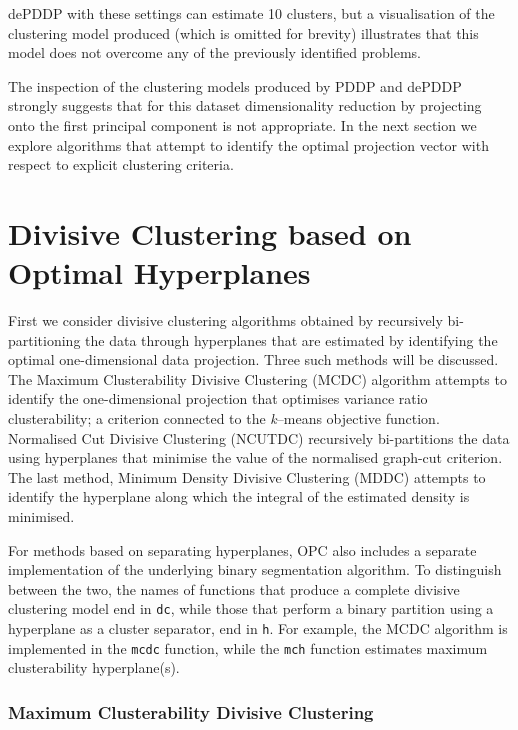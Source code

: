 \documentclass{book}
\begin{document}
\noindent
%
dePDDP with these settings can estimate
10 clusters, but a visualisation of the clustering model produced (which is
omitted for brevity) illustrates that this model does not overcome any of
the previously identified problems.


The inspection of the clustering models produced by PDDP and dePDDP strongly
suggests that for this dataset dimensionality reduction by projecting onto the
first principal component is not appropriate.
%
In the next section we explore algorithms that attempt to identify the optimal
projection vector with respect to explicit clustering criteria.
%

\section{Divisive Clustering based on Optimal Hyperplanes}

First we consider divisive clustering algorithms obtained by recursively
bi-partitioning the data through hyperplanes that are estimated by identifying
the optimal one-dimensional data projection. Three such methods will be
discussed.  The Maximum Clusterability Divisive Clustering (MCDC) algorithm
attempts to identify the one-dimensional projection that optimises variance
ratio clusterability; a criterion connected to the {\it k}--means objective
function. Normalised Cut Divisive Clustering (NCUTDC) recursively bi-partitions the data using hyperplanes
that minimise the value of the normalised graph-cut criterion.
The last method, Minimum Density Divisive Clustering (MDDC) attempts
to identify the hyperplane along which the integral of the estimated density is
minimised.


For methods based on separating hyperplanes, OPC also includes a separate
implementation of the underlying binary segmentation algorithm. To distinguish between the two,
the names of functions that produce a complete divisive clustering model end in {\tt dc},
while those that perform a binary partition using a hyperplane as a
cluster separator, end in {\tt h}.
%
For example, the MCDC algorithm is implemented in the {\tt mcdc} function,
while the {\tt mch} function estimates maximum clusterability
hyperplane(s).

\subsubsection{Maximum Clusterability Divisive Clustering}
\end{document}
